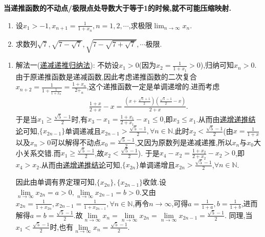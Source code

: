 \documentclass[../../main.tex]{subfiles}
\begin{document}
\begin{remark}
\textbf{当递推函数的不动点/极限点处导数大于等于1的时候,就不可能压缩映射.}
\end{remark}



\begin{example}
\begin{enumerate}
\item 设\(x_1 > - 1,x_{n + 1} = \frac{1}{1 + x_n},n = 1,2,\cdots\),求极限\(\lim_{n \to \infty} x_n\).
\item 求数列\(\sqrt{7},\sqrt{7 - \sqrt{7}},\sqrt{7 - \sqrt{7 + \sqrt{7}}},\cdots\)极限.
\end{enumerate}
\end{example}
\begin{solution}
\begin{enumerate}
\item 
{\color{blue}解法一(\hyperref[proposition:递减函数递推数列]{递减递推归纳法}):}
不妨设$x_1>0$(因为$x_2=\frac{1}{1+x_1}>0$),归纳可知$x_n>0$.由于原递推函数是递减函数,因此考虑递推函数的二次复合$x_{n+2}=\frac{1}{1+\frac{1}{1+x_n}}=\frac{1+x_n}{2+_n}$,这个递推函数一定是单调递增的.进而考虑
\begin{align*}
\frac{1+x}{2+x}-x=\frac{\left( x+\frac{\sqrt{5}+1}{2} \right) \left( \frac{\sqrt{5}-1}{2}-x \right)}{2+x}.
\end{align*}
于是当$x_1\geqslant  \frac{\sqrt{5}-1}{2}$时,有$x_3-x_1=\frac{1+x_1}{2+x_1}-x_1\leqslant 0$,即$x_3\leqslant x_1$.从而由\hyperref[proposition:递增函数递推数列]{递增递推结论}可知,$\{x_{2n-1}\}$单调递减且$x_{2n-1}>\frac{\sqrt{5}-1}{2},\forall n \in \mathbb{N}$.此时\(x_2<\frac{\sqrt{5}-1}{2}\)(由\(x = \frac{1}{1 + x}\)以及$x_n>0$可以解得不动点\(x_0=\frac{\sqrt{5}-1}{2}\),又因为原数列是递减递推,所以\(x_n\)与\(x_0\)大小关系交错.而\(x_1\geqslant\frac{\sqrt{5}-1}{2}\),故\(x_2<\frac{\sqrt{5}-1}{2}\)).
于是\(x_4 - x_2=\frac{1 + x_2}{2 + x_2}-x_2>0\),即\(x_4>x_2\).从而由\hyperref[proposition:递增函数递推数列]{递增递推结论}可知,\(\{x_{2n}\}\)单调递增且\(x_{2n}>\frac{\sqrt{5}-1}{2}\),\(\forall n\in\mathbb{N}\).

因此由单调有界定理可知,$\{x_{2n}\},\{x_{2n-1}\}$收敛.设$\underset{n\rightarrow \infty}{\lim}x_{2n}=a>0,\underset{n\rightarrow \infty}{\lim}x_{2n-1}=b>0$.又由$x_{2n}=\frac{1}{1+x_{2n}},x_{2n-1}=\frac{1}{1+x_{2n-1}},\forall n\in \mathbb{N}$,再令$n\to \infty$,可得$a=\frac{1}{1+a},b=\frac{1}{1+b}$,进而解得$a=b=\frac{\sqrt{5}-1}{2}$.故$\underset{n\rightarrow \infty}{\lim}x_n=\underset{n\rightarrow \infty}{\lim}x_{2n}=\underset{n\rightarrow \infty}{\lim}x_{2n-1}=\frac{\sqrt{5}-1}{2}$.
同理,当$x_1<\frac{\sqrt{5}-1}{2}$时,也有$\underset{n\rightarrow \infty}{\lim}x_n=\frac{\sqrt{5}-1}{2}$.


\end{enumerate}
\end{solution}
\end{document}
